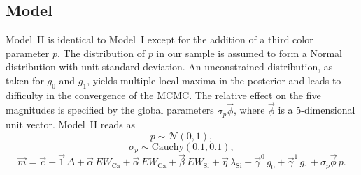 \documentclass[trackchanges]{aastex62}   	%
\begin{document}
\subsection{Model}
\label{modelIImodel:sec}
Model~II is identical to Model~I except for the 
addition of a third color parameter $p$.  The distribution of $p$ in our sample
is assumed to form a Normal distribution with unit standard deviation.  An unconstrained distribution,
as taken for $g_0$ and $g_1$, yields multiple local maxima in the posterior and leads to difficulty in the convergence of the MCMC.
The relative effect on the five magnitudes is specified by the global parameters 
$\sigma_p\vec{\phi}$, where $\vec{\phi}$ is a 5-dimensional unit vector.
Model~II reads as
\begin{equation}
p  \sim \mathcal{N}(0,1 ),
\end{equation}
\begin{equation}
\sigma_p  \sim \text{Cauchy}(0.1,0.1),
\end{equation}
{\begin{equation}
\vec{m}=
 \vec{c} +  \vec{1} \, \Delta + \vec{\alpha} \, EW_{\mathrm{Ca}}+
\vec{\alpha} \,  EW_{\mathrm{Ca}}+
\vec{\beta}  \, EW_{\mathrm{Si}} +
\vec{\eta}  \, \lambda_{\mathrm{Si}} +
\vec{\gamma}^0  \,  g_0 +
\vec{\gamma}^1  \,  g_1 +
\sigma_p \vec{\phi}\,p.
\label{ewsiv2:eqn}
\end{equation}
}
\end{document}
